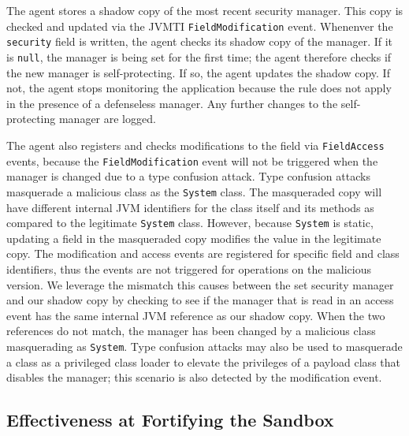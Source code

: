 \documentclass{sig-alternate}
\begin{document}
The agent stores a shadow copy of the most recent security
manager. This copy is checked and updated via the JVMTI \texttt{FieldModification} event.
Whenenver the \texttt{security} field is written, the agent checks its
shadow copy of the manager.  If it is \texttt{null},
the manager is being set for the first time; the agent therefore checks
if the new manager is self-protecting. If so, 
the agent updates the shadow copy. If not, the agent stops monitoring the
application because the rule does not apply in the presence of a defenseless
manager. Any further changes to the self-protecting manager are logged.

The agent also registers and checks modifications to the field via
\texttt{FieldAccess} events, 
because the \texttt{FieldModification} event will not be triggered
when the manager is changed due to a type confusion attack.  Type confusion attacks
masquerade a malicious class as the
\texttt{System} class.  The masqueraded copy will have different internal
JVM identifiers for the class itself and its methods as compared to the legitimate
\texttt{System} class. However, because \texttt{System} is static, updating a
field in the masqueraded copy modifies the value in the legitimate copy. 
The
modification and access events are registered for specific field and
class identifiers, thus the events are not triggered for operations
on the malicious version. We leverage the mismatch this causes between
the set security manager and our shadow copy by checking to see if
the manager that is read in an access event has the same internal
JVM reference as our shadow copy. When the two references do not match,
the manager has been changed by a malicious class masquerading as
\texttt{System}. Type confusion attacks may also be used to masquerade
a class as a privileged class loader to elevate the privileges of
a payload class that disables the manager; this scenario is also detected
by the modification event.


\subsection{Effectiveness at Fortifying the Sandbox}\label{sub:Effectiveness-at-Fortifying}
\end{document}
